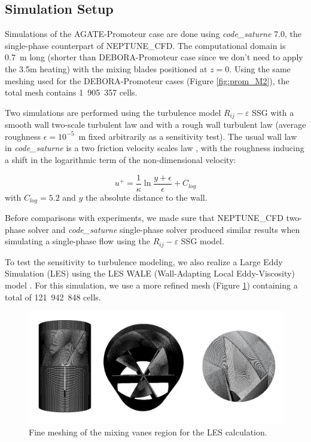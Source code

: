 \subsection{Simulation Setup}

Simulations of the AGATE-Promoteur case are done using \textit{code\_saturne} 7.0, the single-phase counterpart of NEPTUNE\_CFD. The computational domain is 0.7\ m long (shorter than DEBORA-Promoteur case since we don't need to apply the 3.5m heating) with the mixing blades positioned at $z=0$. Using the same meshing used for the DEBORA-Promoteur cases (Figure \ref{fig:prom_M2}), the total mesh contains 1~905~357 cells.

\npar

Two simulations are performed using the turbulence model $R_{ij}-\varepsilon$ SSG with a smooth wall two-scale turbulent law and with a rough wall turbulent law (average roughness $\epsilon = 10^{-5}$\ m fixed arbitrarily as a sensitivity test). The usual wall law in \textit{code\_saturne} is a two friction velocity scales law \cite{noauthor_code_saturne_2021}, with the roughness inducing a shift in the logarithmic term of the non-dimensional velocity:

\begin{equation}
u^{+} = \frac{1}{\kappa}\ln{\dfrac{y+\epsilon}{\epsilon}} + C_{log}
\end{equation}
with $C_{log}=5.2$ and $y$ the absolute distance to the wall.



\npar
\begin{note*}{}
Before comparisons with experiments, we made sure that NEPTUNE\_CFD two-phase solver and \textit{code\_saturne} single-phase solver produced similar results when simulating a single-phase flow using the $R_{ij}-\varepsilon$ SSG model.
\end{note*}

\npar


To test the sensitivity to turbulence modeling, we also realize a Large Eddy Simulation (LES) using the LES WALE (Wall-Adapting Local Eddy-Viscosity) model \cite{nicoud_subgrid-scale_1999}. For this simulation, we use a more refined mesh (Figure \ref{fig:prom_M4}) containing a total of 121~942~848 cells. 

%
\begin{figure}[!h]
\centering
\includegraphics[width=1.0\linewidth]{img/AGATE/prom_M4_all.png}
\caption{Fine meshing of the mixing vanes region for the LES calculation.}
\label{fig:prom_M4}
\end{figure}
%

